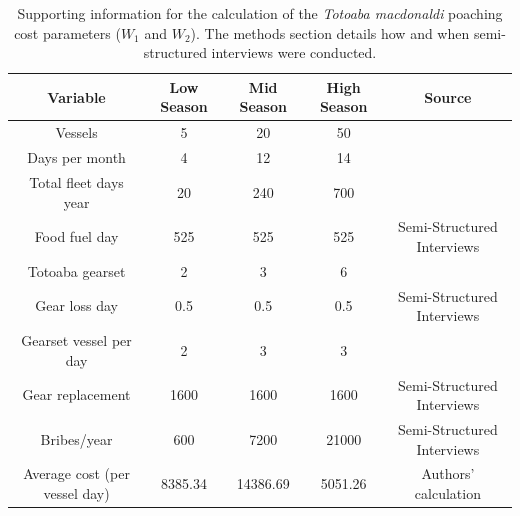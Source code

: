\begin{landscape}
\begin{table}[H]
\centering
\begin{tabular}[t]{ccccc}
\hline 
Variable & Low Season & Mid Season & High Season & Source\\
\hline \hline
Vessels & 5 & 20 & 50 & \cite{cisneros-mata_evaluacion_2020} \\
Days per month & 4 & 12 & 14 & \cite{cisneros-mata_evaluacion_2020}\\
Total fleet days year & 20 & 240 & 700 & \cite{cisneros-mata_evaluacion_2020}\\
Food fuel day & 525 & 525 & 525 & Semi-Structured Interviews\\
Totoaba gearset & 2 & 3 & 6 & \cite{cisneros-mata_evaluacion_2020}\\
Gear loss day & 0.5 & 0.5 & 0.5 & Semi-Structured Interviews\\
Gearset vessel per day & 2 & 3 & 3 & \cite{cisneros-mata_evaluacion_2020}\\
Gear replacement & 1600 & 1600 & 1600 & Semi-Structured Interviews\\
Bribes/year & 600 & 7200 & 21000 & Semi-Structured Interviews\\
\hline 
Average cost (per vessel day) & 8385.34 & 14386.69 & 5051.26 & Authors' calculation\\
\hline \hline
\end{tabular}
\label{tab:costW}
\caption{Supporting information for the calculation of the\textit{ Totoaba macdonaldi} poaching cost parameters ($W_1$ and $W_2$). The methods section details how and when semi-structured
 interviews were conducted.}
\end{table}
\end{landscape}
\newpage


